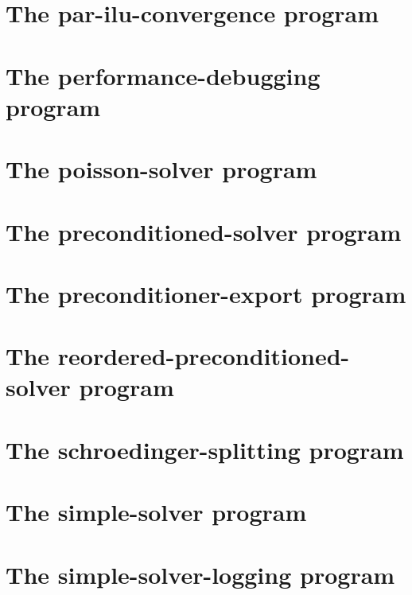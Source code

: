 \let\mypdfximage\pdfximage\def\pdfximage{\immediate\mypdfximage}\documentclass[twoside]{book}
\newcommand{\+}{\discretionary{\mbox{\scriptsize$\hookleftarrow$}}{}{}}
\begin{document}
\chapter{The par-\/ilu-\/convergence program}
\label{par_ilu_convergence}

\chapter{The performance-\/debugging program}
\label{performance_debugging}

\chapter{The poisson-\/solver program}
\label{poisson_solver}

\chapter{The preconditioned-\/solver program}
\label{preconditioned_solver}

\chapter{The preconditioner-\/export program}
\label{preconditioner_export}

\chapter{The reordered-\/preconditioned-\/solver program}
\label{reordered_preconditioned_solver}

\chapter{The schroedinger-\/splitting program}
\label{schroedinger_splitting}

\chapter{The simple-\/solver program}
\label{simple_solver}

\chapter{The simple-\/solver-\/logging program}
\label{simple_solver_logging}

\end{document}
